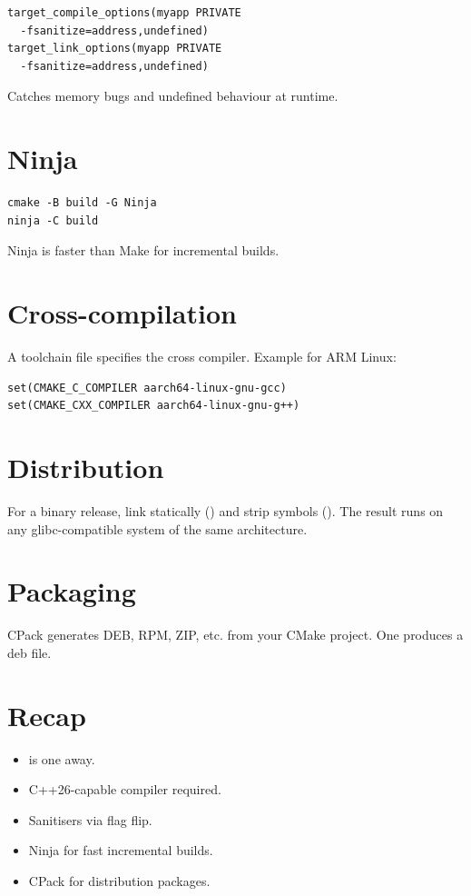 \begin{lstlisting}
target_compile_options(myapp PRIVATE
  -fsanitize=address,undefined)
target_link_options(myapp PRIVATE
  -fsanitize=address,undefined)
\end{lstlisting}

Catches memory bugs and undefined behaviour at runtime.

\section{Ninja}

\begin{lstlisting}
cmake -B build -G Ninja
ninja -C build
\end{lstlisting}

Ninja is faster than Make for incremental builds.

\section{Cross-compilation}

A toolchain file specifies the cross compiler. Example for
ARM Linux:

\begin{lstlisting}
set(CMAKE_C_COMPILER aarch64-linux-gnu-gcc)
set(CMAKE_CXX_COMPILER aarch64-linux-gnu-g++)
\end{lstlisting}

\section{Distribution}

For a binary release, link statically () and
strip symbols (). The result runs on any
glibc-compatible system of the same architecture.

\section{Packaging}

CPack generates DEB, RPM, ZIP, etc. from your CMake
project. One  produces a deb file.

\section{Recap}

\begin{recap}
\begin{itemize}[leftmargin=*]
  \item \maya{} is one  away.
  \item C++26-capable compiler required.
  \item Sanitisers via flag flip.
  \item Ninja for fast incremental builds.
  \item CPack for distribution packages.
\end{itemize}
\end{recap}

